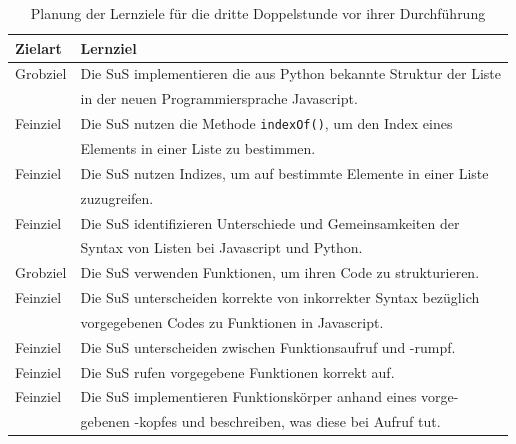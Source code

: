 \begin{table}[h!]
\begin{tabular*}{\linewidth}{l|l}
	\hline
	\textbf{Zielart} & \textbf{Lernziel}\\
	\hline \hline
	Grobziel & Die SuS implementieren die aus Python bekannte Struktur der Liste\\
	& in der neuen Programmiersprache Javascript.\\
	Feinziel & Die SuS nutzen die Methode \texttt{indexOf()}, um den Index eines\\
	& Elements in einer Liste zu bestimmen.\\
	Feinziel & Die SuS nutzen Indizes, um auf bestimmte Elemente in einer Liste\\
	& zuzugreifen.\\
	Feinziel & Die SuS identifizieren Unterschiede und Gemeinsamkeiten der\\
	& Syntax von Listen bei Javascript und Python.\\
	\hline
	Grobziel & Die SuS verwenden Funktionen, um ihren Code zu strukturieren.\\
	Feinziel & Die SuS unterscheiden korrekte von inkorrekter Syntax bezüglich\\
	& vorgegebenen Codes zu Funktionen in Javascript.\\
	Feinziel & Die SuS unterscheiden zwischen Funktionsaufruf und -rumpf.\\
	Feinziel & Die SuS rufen vorgegebene Funktionen korrekt auf.\\
	Feinziel & Die SuS implementieren Funktionskörper anhand eines vorge-\\
	& gebenen -kopfes und beschreiben, was diese bei Aufruf tut.\\
	\hline
\end{tabular*}
\caption{Planung der Lernziele für die dritte Doppelstunde vor ihrer Durchführung}
\label{tab:lernziele-3-vorher}
\end{table}

